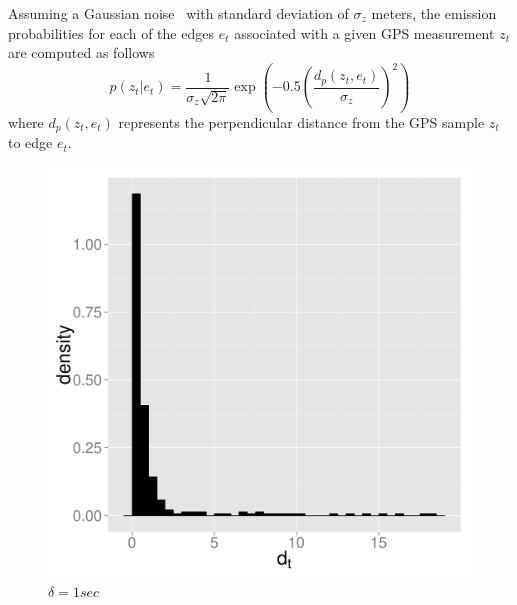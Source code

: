 \documentclass{wscpaperproc}
\theoremstyle{wsc}
\begin{document}
Assuming a Gaussian noise~\cite{newson2009hidden} with standard deviation of $\sigma_{z}$ meters, the emission probabilities for each of the edges $e_{t}$ associated with a given GPS measurement $z_{t}$ are computed as follows
\begin{equation} 
\label{eq:emission_prob}
p(z_{t}|e_{t})= \frac{1}{\sigma_{z}\sqrt{2\pi}}\exp(-0.5(\frac{d_{p}(z_{t},e_{t})}{\sigma_{z}})^2)
\end{equation}
where $d_{p}(z_{t},e_{t})$ represents the perpendicular distance from the GPS sample $z_{t}$ to edge $e_{t}$.


\begin{figure}[h]
\label{fig:prob-density}
  \centering
\begin{minipage}[c]{.3\textwidth}
\centering
    \includegraphics[scale=0.25]{1sec.pdf}
    \caption*{$\delta=1 sec$}
\end{minipage}
\hspace*{\fill} %
\begin{minipage}[c]{.3\textwidth}
\centering

\end{minipage}
\end{figure}
\end{document}
